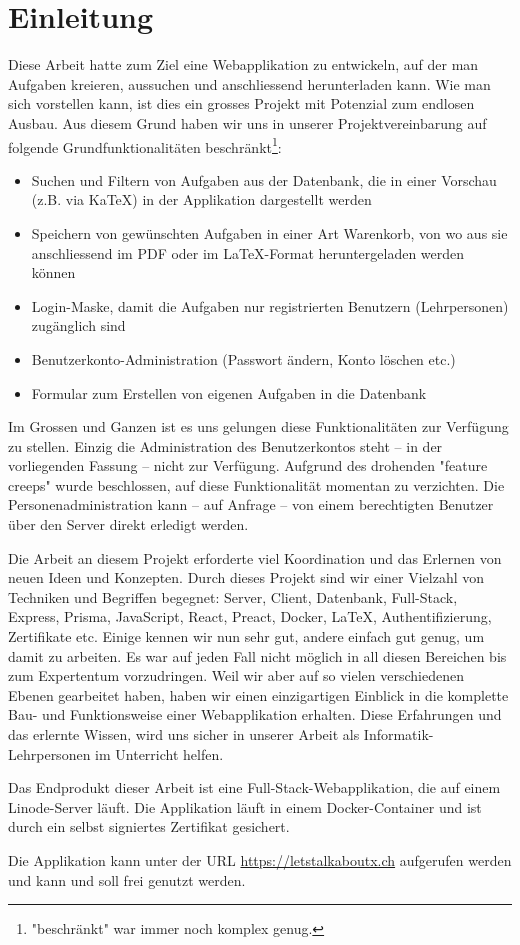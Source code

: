 
\section{Einleitung}

Diese Arbeit hatte zum Ziel eine Webapplikation zu entwickeln, auf der man Aufgaben kreieren, aussuchen und anschliessend herunterladen kann. Wie man sich vorstellen kann, ist dies ein grosses Projekt mit Potenzial zum endlosen Ausbau. Aus diesem Grund haben wir uns in unserer Projektvereinbarung auf folgende Grundfunktionalitäten beschränkt\footnote{"beschränkt" war immer noch komplex genug.}:
\begin{itemize}
  \item Suchen und Filtern von Aufgaben aus der Datenbank, die in einer Vorschau (z.B. via KaTeX) in der Applikation dargestellt werden
  \item Speichern von gewünschten Aufgaben in einer Art Warenkorb, von wo aus sie anschliessend im PDF oder im LaTeX-Format heruntergeladen werden können
  \item Login-Maske, damit die Aufgaben nur registrierten Benutzern (Lehrpersonen) zugänglich sind
  \item Benutzerkonto-Administration (Passwort ändern, Konto löschen etc.)
  \item Formular zum Erstellen von eigenen Aufgaben in die Datenbank
\end{itemize}

Im Grossen und Ganzen ist es uns gelungen diese Funktionalitäten zur Verfügung zu stellen. Einzig die Administration des Benutzerkontos steht -- in der vorliegenden Fassung -- nicht zur Verfügung. Aufgrund des drohenden "feature creeps" wurde beschlossen, auf diese Funktionalität momentan zu verzichten. Die Personenadministration kann -- auf Anfrage -- von einem berechtigten Benutzer über den Server direkt erledigt werden.

Die Arbeit an diesem Projekt erforderte viel Koordination und das Erlernen von neuen Ideen und Konzepten.  Durch dieses Projekt sind wir einer Vielzahl von Techniken und Begriffen begegnet: Server, Client, Datenbank, Full-Stack, Express, Prisma, JavaScript, React, Preact, Docker, \LaTeX, Authentifizierung, Zertifikate etc. Einige kennen wir nun sehr gut, andere einfach gut genug, um damit zu arbeiten. Es war auf jeden Fall nicht möglich in all diesen Bereichen bis zum Expertentum vorzudringen. Weil wir aber auf so vielen verschiedenen Ebenen gearbeitet haben, haben wir einen einzigartigen Einblick in die komplette Bau- und Funktionsweise einer Webapplikation erhalten. Diese Erfahrungen und das erlernte Wissen, wird uns sicher in unserer Arbeit als Informatik-Lehrpersonen im Unterricht helfen.

Das Endprodukt dieser Arbeit ist eine Full-Stack-Webapplikation, die auf einem Linode-Server läuft. Die Applikation läuft in einem Docker-Container und ist durch ein selbst signiertes Zertifikat gesichert.

Die Applikation kann unter der URL \url{https://letstalkaboutx.ch} aufgerufen werden und kann und soll frei genutzt werden.